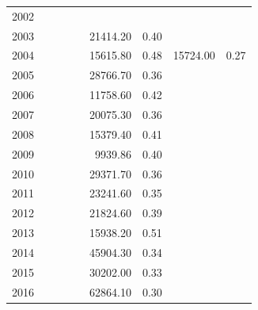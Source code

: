 \documentclass[12pt,]{article}
\begin{document}
\begin{table}[ht]
\begin{tabular}{rrrrrrrrr}
  2002 &  &  &  &  &  &  &  &  \\ 
  2003 &  &  &  &  & 21414.20 & 0.40 &  &  \\ 
  2004 &  &  &  &  & 15615.80 & 0.48 & 15724.00 & 0.27 \\ 
  2005 &  &  &  &  & 28766.70 & 0.36 &  &  \\ 
  2006 &  &  &  &  & 11758.60 & 0.42 &  &  \\ 
  2007 &  &  &  &  & 20075.30 & 0.36 &  &  \\ 
  2008 &  &  &  &  & 15379.40 & 0.41 &  &  \\ 
  2009 &  &  &  &  & 9939.86 & 0.40 &  &  \\ 
  2010 &  &  &  &  & 29371.70 & 0.36 &  &  \\ 
  2011 &  &  &  &  & 23241.60 & 0.35 &  &  \\ 
  2012 &  &  &  &  & 21824.60 & 0.39 &  &  \\ 
  2013 &  &  &  &  & 15938.20 & 0.51 &  &  \\ 
  2014 &  &  &  &  & 45904.30 & 0.34 &  &  \\ 
  2015 &  &  &  &  & 30202.00 & 0.33 &  &  \\ 
  2016 &  &  &  &  & 62864.10 & 0.30 &  &  \\ 
   \hline
\end{tabular}
\end{table}\newpage

\FloatBarrier
\end{document}
